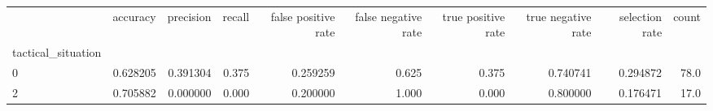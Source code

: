 \begin{tabular}{lrrrrrrrrr}
\toprule
{} &  accuracy &  precision &  recall &  false positive rate &  false negative rate &  true positive rate &  true negative rate &  selection rate &  count \\
tactical\_situation &           &            &         &                      &                      &                     &                     &                 &        \\
\midrule
0                  &  0.628205 &   0.391304 &   0.375 &             0.259259 &                0.625 &               0.375 &            0.740741 &        0.294872 &   78.0 \\
2                  &  0.705882 &   0.000000 &   0.000 &             0.200000 &                1.000 &               0.000 &            0.800000 &        0.176471 &   17.0 \\
\bottomrule
\end{tabular}
